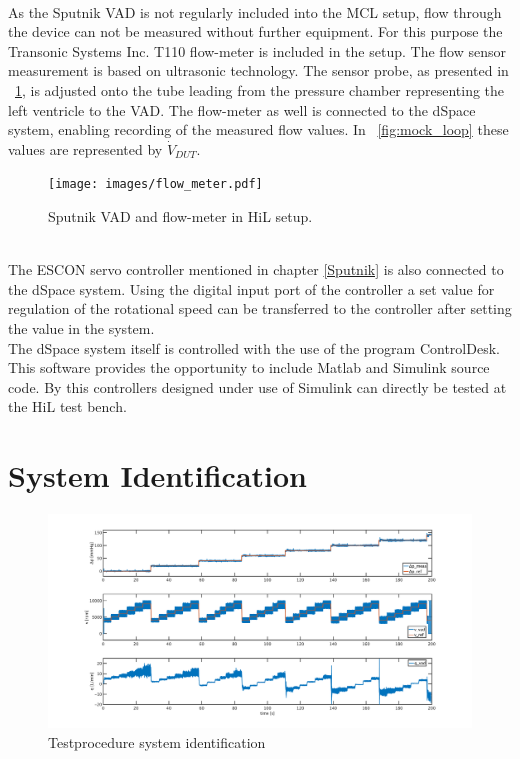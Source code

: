 \\As the Sputnik VAD is not regularly included into the MCL setup, flow through the device can not be measured without further equipment. For this purpose the Transonic Systems Inc. T110 flow-meter is included in the setup. The flow sensor measurement is based on ultrasonic technology. The sensor probe, as presented in \figurename~\ref{fig:flow_meter_tube}, is adjusted onto the tube leading from the pressure chamber representing the left ventricle to the VAD. The flow-meter as well is connected to the dSpace system, enabling recording of the measured flow values. In \figurename~\ref{fig:mock_loop} these values are represented by $\dot{V}_{DUT}$.
\begin{figure}[ht]
  \centering
  \texttt{[image: images/flow\_meter.pdf]}
  \caption[Sputnik VAD and flow-meter in HiL setup]{Sputnik VAD and flow-meter in HiL setup.}
  \label{fig:flow_meter_tube}
\end{figure}
\\The ESCON servo controller mentioned in chapter \ref{Sputnik} is also connected to the dSpace system. Using the digital input port of the controller a set value for regulation of the rotational speed can be transferred to the controller after setting the value in the system.
\\The dSpace system itself is controlled with the use of the program ControlDesk. This software provides the opportunity to include Matlab and Simulink source code. By this controllers designed under use of Simulink can directly be tested at the HiL test bench.

\section{System Identification}

\begin{figure}
  \includegraphics[width=\textwidth]{images/plots_syst_ident/Test_60w40g_long.pdf}
  \caption[Testprocedure system identification]{Testprocedure system identification}
  \label{fig:test_60w40g_long}
\end{figure}

